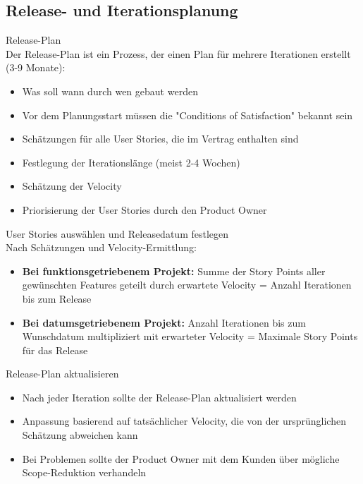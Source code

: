 \subsection{Release- und Iterationsplanung}

\begin{concept}{Release-Plan}\\
    Der Release-Plan ist ein Prozess, der einen Plan für mehrere Iterationen erstellt (3-9 Monate):
    \begin{itemize}
        \item Was soll wann durch wen gebaut werden
        \item Vor dem Planungsstart müssen die "Conditions of Satisfaction" bekannt sein
        \item Schätzungen für alle User Stories, die im Vertrag enthalten sind
        \item Festlegung der Iterationslänge (meist 2-4 Wochen)
        \item Schätzung der Velocity
        \item Priorisierung der User Stories durch den Product Owner
    \end{itemize}
\end{concept}

\begin{concept}{User Stories auswählen und Releasedatum festlegen}\\
    Nach Schätzungen und Velocity-Ermittlung:
    \begin{itemize}
        \item \textbf{Bei funktionsgetriebenem Projekt:} Summe der Story Points aller gewünschten Features geteilt durch erwartete Velocity = Anzahl Iterationen bis zum Release
        \item \textbf{Bei datumsgetriebenem Projekt:} Anzahl Iterationen bis zum Wunschdatum multipliziert mit erwarteter Velocity = Maximale Story Points für das Release
    \end{itemize}
\end{concept}

\begin{concept}{Release-Plan aktualisieren}\\
    \begin{itemize}
        \item Nach jeder Iteration sollte der Release-Plan aktualisiert werden
        \item Anpassung basierend auf tatsächlicher Velocity, die von der ursprünglichen Schätzung abweichen kann
        \item Bei Problemen sollte der Product Owner mit dem Kunden über mögliche Scope-Reduktion verhandeln
    \end{itemize}
\end{concept}

